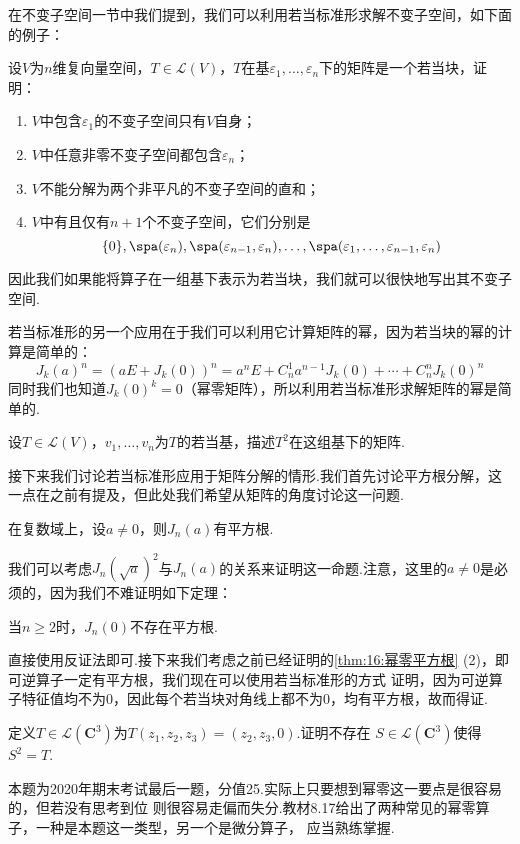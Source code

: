 在不变子空间一节中我们提到，我们可以利用若当标准形求解不变子空间，如下面的例子：
\begin{example}
    设$V$为$n$维复向量空间，$T\in \mathcal{L}(V)$，$T$在基$\varepsilon_1,\ldots,\varepsilon_n$下的矩阵是一个若当块，证明：
    \begin{enumerate}
        \item $V$中包含$\varepsilon_1$的不变子空间只有$V$自身；

        \item $V$中任意非零不变子空间都包含$\varepsilon_n$；

        \item $V$不能分解为两个非平凡的不变子空间的直和；

        \item $V$中有且仅有$n+1$个不变子空间，它们分别是
        \[\{0\},\spa(\varepsilon_n),\spa(\varepsilon_{n-1},\varepsilon_n),\ldots,\spa(\varepsilon_1,\ldots,\varepsilon_{n-1},\varepsilon_n)\]
    \end{enumerate}
\end{example}
因此我们如果能将算子在一组基下表示为若当块，我们就可以很快地写出其不变子空间.

若当标准形的另一个应用在于我们可以利用它计算矩阵的幂，因为若当块的幂的计算是简单的：
\[J_k(a)^n=(aE+J_k(0))^n=a^nE+C_n^1a^{n-1}J_k(0)+\cdots+C_n^nJ_k(0)^n\]
同时我们也知道$J_k(0)^k=0$（幂零矩阵），所以利用若当标准形求解矩阵的幂是简单的.
\begin{example}
    设$T\in \mathcal{L}(V)$，$v_1,\ldots,v_n$为$T$的若当基，描述$T^2$在这组基下的矩阵.
\end{example}
接下来我们讨论若当标准形应用于矩阵分解的情形.我们首先讨论平方根分解，这一点在之前有提及，但此处我们希望从矩阵的角度讨论这一问题.
\begin{theorem}
    在复数域上，设$a\neq 0$，则$J_n(a)$有平方根.
\end{theorem}
我们可以考虑$J_n(\sqrt{a})^2$与$J_n(a)$的关系来证明这一命题.注意，这里的$a\neq 0$是必须的，因为我们不难证明如下定理：
\begin{theorem}
    当$n\geqslant 2$时，$J_n(0)$不存在平方根.
\end{theorem}
直接使用反证法即可.接下来我们考虑之前已经证明的\autoref{thm:16:幂零平方根} (2)，即可逆算子一定有平方根，我们现在可以使用若当标准形的方式
证明，因为可逆算子特征值均不为0，因此每个若当块对角线上都不为0，均有平方根，故而得证.
\begin{example}
    定义$T\in \mathcal{L}(\mathbf{C}^3)$为$T(z_1,z_2,z_3)=(z_2,z_3,0)$.证明不存在
    $S\in \mathcal{L}(\mathbf{C}^3)$使得$S^2=T$.
\end{example}
本题为2020年期末考试最后一题，分值25.实际上只要想到幂零这一要点是很容易的，但若没有思考到位
则很容易走偏而失分.教材8.17给出了两种常见的幂零算子，一种是本题这一类型，另一个是微分算子，
应当熟练掌握.

